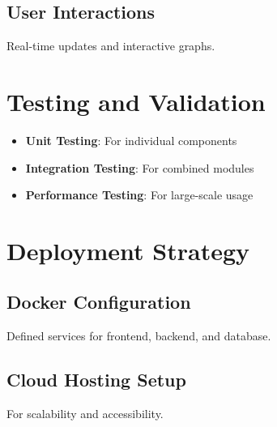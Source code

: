 \documentclass{article}
\begin{document}
\subsection{User Interactions}
Real-time updates and interactive graphs.

\section{Testing and Validation}
\begin{itemize}
\item \textbf{Unit Testing}: For individual components
\item \textbf{Integration Testing}: For combined modules
\item \textbf{Performance Testing}: For large-scale usage
\end{itemize}

\section{Deployment Strategy}
\subsection{Docker Configuration}
Defined services for frontend, backend, and database.

\subsection{Cloud Hosting Setup}
For scalability and accessibility.
\end{document}
